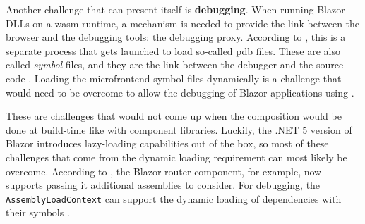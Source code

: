 Another challenge that can present itself is \textbf{debugging}. When running
Blazor DLLs on a \gls{wasm} runtime, a mechanism is needed to provide the link
between the browser and the debugging tools: the debugging proxy. According to
\textcite{Abdalla_2020}, this is a separate process that gets launched to load
so-called \gls{pdb} files. These are also called \textit{symbol} files, and they
are the link between the debugger and the source code \autocite{Microsoft_2021}.
Loading the \gls{microfrontend} symbol files dynamically is a challenge that
would need to be overcome to allow the debugging of Blazor applications using
.

These are challenges that would not come up when the composition would be done
at build-time like with component libraries. Luckily, the .NET 5 version of
Blazor introduces lazy-loading capabilities out of the
box, so most of these challenges that come from the dynamic loading
requirement can most likely be overcome. According to \textcite{Kdouh_2020}, the
Blazor router component, for example, now supports passing it additional
assemblies to consider. For debugging, the \texttt{AssemblyLoadContext} can
support the dynamic loading of dependencies with their symbols
\autocite{Microsoft_2019}. 